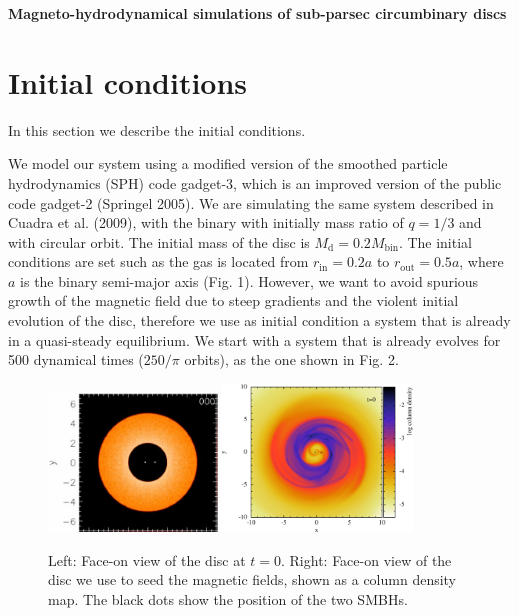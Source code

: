 \documentclass[a4paper,12pt]{article}
\begin{document}
\begin{center}
{\large\textbf{Magneto-hydrodynamical simulations of sub-parsec circumbinary discs
}} \\

\end{center}

\bigskip

\section{Initial conditions}

In this section we describe the initial conditions.

We model our system using a modified version of the
smoothed particle hydrodynamics (SPH) code gadget-3,
which is an improved version of the public code gadget-2
(Springel 2005).
We are simulating the same system described in Cuadra
et al. (2009), with the binary with initially mass ratio of
$q = 1/3$ and with circular orbit. The initial mass of the disc
is $M_\text{d} = 0.2M_{\text{bin}}$. The initial conditions are set such as the
gas is located from $r_{\text{in}} = 0.2a$ to $r_{\text{out}} = 0.5a$, where $a$ is the
binary semi-major axis (Fig. 1). However, we want to avoid spurious growth of the magnetic field due to steep gradients and
the violent initial evolution of the disc, therefore we use as
initial condition a system that is already in a quasi-steady
equilibrium. We start with a system that is already evolves
for 500 dynamical times ($250/\pi$ orbits), as the one shown in
Fig. 2.
\begin{figure}[!ht]
 \begin{center}
 \includegraphics[width=0.4\textwidth]{figs/fig1.eps}
  \includegraphics[width=0.45\textwidth]{figs/ic.eps}
  \caption{Left: Face-on view of the disc at $t=0$. Right: Face-on view of the disc we use to seed the magnetic fields, 
  shown as a column density map. The black dots show the position of the two SMBHs.}
 \end{center}
\end{figure}
\end{document}
